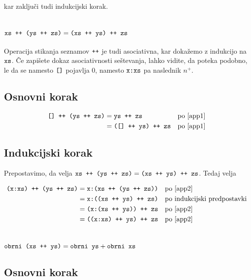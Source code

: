 \documentclass[11pt,a4paper]{article}
\begin{document}
kar zaključi tudi indukcijski korak.


\section{$\mbox{\texttt{xs ++ (ys ++ zs)}} = \mbox{\texttt{(xs ++ ys) ++ zs}}$}
\label{sec:asociativnost}

Operacija stikanja seznamov $\mbox{\texttt{++}}$ je tudi asociativna, kar dokažemo z indukcijo na $\mbox{\texttt{xs}}$. Če zapišete dokaz asociativnosti seštevanja, lahko vidite, da poteka podobno, le da se namesto $\mbox{\texttt{[]}}$ pojavlja $0$, namesto $\mbox{\texttt{x:xs}}$ pa naslednik $n^{+}$.

\subsection*{Osnovni korak}

\begin{align*}
  \mbox{\texttt{[] ++ (ys ++ zs)}}
  &= \mbox{\texttt{ys ++ zs}}
    &&\text{po \eqref{app1}} \\
  &= \mbox{\texttt{([] ++ ys) ++ zs}}
    &&\text{po \eqref{app1}}
\end{align*}

\subsection*{Indukcijski korak}

Prepostavimo, da velja $\mbox{\texttt{xs ++ (ys ++ zs)}} = \mbox{\texttt{(xs ++ ys) ++ zs}}$. Tedaj velja

\begin{align*}
  \mbox{\texttt{(x:xs) ++ (ys ++ zs)}}
  &= \mbox{\texttt{x:(xs ++ (ys ++ zs))}}
    &&\text{po \eqref{app2}} \\
  &= \mbox{\texttt{x:((xs ++ ys) ++ zs)}}
    &&\text{po indukcijski predpostavki} \\
  &= \mbox{\texttt{(x:(xs ++ ys)) ++ zs}}
    &&\text{po \eqref{app2}} \\
  &= \mbox{\texttt{((x:xs) ++ ys) ++ zs}}
    &&\text{po \eqref{app2}}
\end{align*}


\section{$\mbox{\texttt{obrni (xs ++ ys)}} = \mbox{\texttt{obrni ys}} + \mbox{\texttt{obrni xs}}$}

\subsection*{Osnovni korak}
\end{document}
